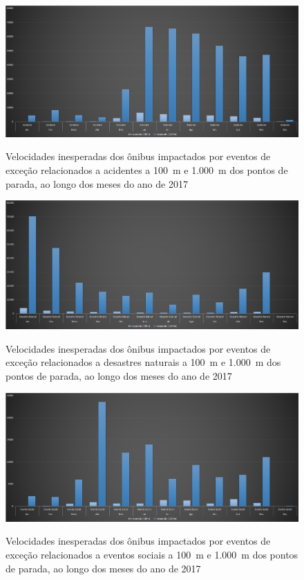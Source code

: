 \documentclass[
	12pt,				%
	oneside,			%
	a4paper,			%
	english,			%
	brazil				%
	]{abntex2ppgsi}
\begin{document}
{{{\begin{figure}[!htb]
	\centering
 	  \caption{Velocidades inesperadas dos ônibus impactados por eventos de exceção relacionados a acidentes a 100~m e 1.000~m dos pontos de parada, ao longo dos meses do ano de 2017}
		\includegraphics[width=1\linewidth]{images/apriori_analysis_stops_accidents.png}
	\label{fig:apriori_analysis_stops_accidents}
\end{figure}

\begin{figure}[!htb]
	\centering
 	  \caption{Velocidades inesperadas dos ônibus impactados por eventos de exceção relacionados a desastres naturais a 100~m e 1.000~m dos pontos de parada, ao longo dos meses do ano de 2017}
		\includegraphics[width=1\linewidth]{images/apriori_analysis_stops_natural_disasters.png}
	\label{fig:apriori_analysis_stops_natural_disasters}
\end{figure}

\begin{figure}[!htb]
	\centering
 	  \caption{Velocidades inesperadas dos ônibus impactados por eventos de exceção relacionados a eventos sociais a 100~m e 1.000~m dos pontos de parada, ao longo dos meses do ano de 2017}
		\includegraphics[width=1\linewidth]{images/apriori_analysis_stops_social_events.png}
	\label{fig:apriori_analysis_stops_social_events}
\end{figure}

}}}
\end{document}

